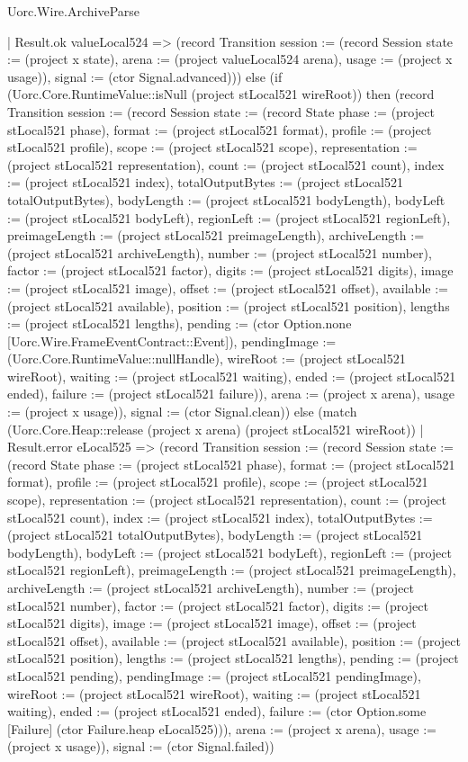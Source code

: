 \begin{lexlean}{Uorc.Wire.ArchiveParse}
\begin{semanticmodule}
{      | Result.ok valueLocal524 => (record Transition {session := (record Session {state := (project x state), arena := (project valueLocal524 arena), usage := (project x usage)}), signal := (ctor Signal.advanced)})) else (if (Uorc.Core.RuntimeValue::isNull (project stLocal521 wireRoot)) then (record Transition {session := (record Session {state := (record State {phase := (project stLocal521 phase), format := (project stLocal521 format), profile := (project stLocal521 profile), scope := (project stLocal521 scope), representation := (project stLocal521 representation), count := (project stLocal521 count), index := (project stLocal521 index), totalOutputBytes := (project stLocal521 totalOutputBytes), bodyLength := (project stLocal521 bodyLength), bodyLeft := (project stLocal521 bodyLeft), regionLeft := (project stLocal521 regionLeft), preimageLength := (project stLocal521 preimageLength), archiveLength := (project stLocal521 archiveLength), number := (project stLocal521 number), factor := (project stLocal521 factor), digits := (project stLocal521 digits), image := (project stLocal521 image), offset := (project stLocal521 offset), available := (project stLocal521 available), position := (project stLocal521 position), lengths := (project stLocal521 lengths), pending := (ctor Option.none [Uorc.Wire.FrameEventContract::Event]), pendingImage := (Uorc.Core.RuntimeValue::nullHandle), wireRoot := (project stLocal521 wireRoot), waiting := (project stLocal521 waiting), ended := (project stLocal521 ended), failure := (project stLocal521 failure)}), arena := (project x arena), usage := (project x usage)}), signal := (ctor Signal.clean)}) else (match (Uorc.Core.Heap::release (project x arena) (project stLocal521 wireRoot))
      | Result.error eLocal525 => (record Transition {session := (record Session {state := (record State {phase := (project stLocal521 phase), format := (project stLocal521 format), profile := (project stLocal521 profile), scope := (project stLocal521 scope), representation := (project stLocal521 representation), count := (project stLocal521 count), index := (project stLocal521 index), totalOutputBytes := (project stLocal521 totalOutputBytes), bodyLength := (project stLocal521 bodyLength), bodyLeft := (project stLocal521 bodyLeft), regionLeft := (project stLocal521 regionLeft), preimageLength := (project stLocal521 preimageLength), archiveLength := (project stLocal521 archiveLength), number := (project stLocal521 number), factor := (project stLocal521 factor), digits := (project stLocal521 digits), image := (project stLocal521 image), offset := (project stLocal521 offset), available := (project stLocal521 available), position := (project stLocal521 position), lengths := (project stLocal521 lengths), pending := (project stLocal521 pending), pendingImage := (project stLocal521 pendingImage), wireRoot := (project stLocal521 wireRoot), waiting := (project stLocal521 waiting), ended := (project stLocal521 ended), failure := (ctor Option.some [Failure] (ctor Failure.heap eLocal525))}), arena := (project x arena), usage := (project x usage)}), signal := (ctor Signal.failed)})
}
\end{semanticmodule}
\end{lexlean}
